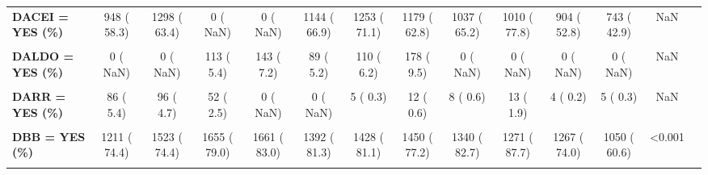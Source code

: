 \documentclass[
]{article}
\begin{document}
\begin{table}[H]
\begin{tabular}[t]{>{\raggedright\arraybackslash}p{5em}ccccccccccccc}
\textbf{DACEI = YES (\%)} & 948 ( 58.3) & 1298 ( 63.4) & 0 (  NaN) & 0 (  NaN) & 1144 ( 66.9) & 1253 ( 71.1) & 1179 ( 62.8) & 1037 ( 65.2) & 1010 ( 77.8) & 904 ( 52.8) & 743 ( 42.9) & NaN & \\
\textbf{\cellcolor{gray!10}{DACOAG = YES (\%)}} & \cellcolor{gray!10}{122 (  8.1)} & \cellcolor{gray!10}{54 (  2.6)} & \cellcolor{gray!10}{72 (  3.4)} & \cellcolor{gray!10}{94 (  4.8)} & \cellcolor{gray!10}{86 (  5.0)} & \cellcolor{gray!10}{79 (  4.5)} & \cellcolor{gray!10}{113 (  6.0)} & \cellcolor{gray!10}{130 (  7.4)} & \cellcolor{gray!10}{164 ( 17.1)} & \cellcolor{gray!10}{141 (  8.2)} & \cellcolor{gray!10}{123 (  7.1)} & \cellcolor{gray!10}{<0.001} & \cellcolor{gray!10}{}\\
\textbf{DALDO = YES (\%)} & 0 (  NaN) & 0 (  NaN) & 113 (  5.4) & 143 (  7.2) & 89 (  5.2) & 110 (  6.2) & 178 (  9.5) & 0 (  NaN) & 0 (  NaN) & 0 (  NaN) & 0 (  NaN) & NaN & \\
\textbf{\cellcolor{gray!10}{DARBL = YES (\%)}} & \cellcolor{gray!10}{0 (  NaN)} & \cellcolor{gray!10}{0 (  NaN)} & \cellcolor{gray!10}{0 (  NaN)} & \cellcolor{gray!10}{0 (  NaN)} & \cellcolor{gray!10}{139 (  8.1)} & \cellcolor{gray!10}{158 (  9.0)} & \cellcolor{gray!10}{256 ( 13.6)} & \cellcolor{gray!10}{273 ( 18.8)} & \cellcolor{gray!10}{275 ( 32.2)} & \cellcolor{gray!10}{356 ( 20.8)} & \cellcolor{gray!10}{332 ( 19.2)} & \cellcolor{gray!10}{NaN} & \cellcolor{gray!10}{}\\
\textbf{DARR = YES (\%)} & 86 (  5.4) & 96 (  4.7) & 52 (  2.5) & 0 (  NaN) & 0 (  NaN) & 5 (  0.3) & 12 (  0.6) & 8 (  0.6) & 13 (  1.9) & 4 (  0.2) & 5 (  0.3) & NaN & \\
\textbf{\cellcolor{gray!10}{DASA = YES (\%)}} & \cellcolor{gray!10}{1554 ( 93.7)} & \cellcolor{gray!10}{1839 ( 89.8)} & \cellcolor{gray!10}{1914 ( 91.4)} & \cellcolor{gray!10}{1937 ( 96.7)} & \cellcolor{gray!10}{1635 ( 95.4)} & \cellcolor{gray!10}{1684 ( 95.7)} & \cellcolor{gray!10}{1769 ( 94.1)} & \cellcolor{gray!10}{1673 ( 95.7)} & \cellcolor{gray!10}{1639 ( 98.3)} & \cellcolor{gray!10}{1550 ( 90.5)} & \cellcolor{gray!10}{1320 ( 76.1)} & \cellcolor{gray!10}{<0.001} & \cellcolor{gray!10}{}\\
\textbf{DBB = YES (\%)} & 1211 ( 74.4) & 1523 ( 74.4) & 1655 ( 79.0) & 1661 ( 83.0) & 1392 ( 81.3) & 1428 ( 81.1) & 1450 ( 77.2) & 1340 ( 82.7) & 1271 ( 87.7) & 1267 ( 74.0) & 1050 ( 60.6) & <0.001 & \\
\textbf{\cellcolor{gray!10}{DCANT = YES (\%)}} & \cellcolor{gray!10}{253 ( 16.2)} & \cellcolor{gray!10}{265 ( 12.9)} & \cellcolor{gray!10}{294 ( 14.0)} & \cellcolor{gray!10}{0 (  NaN)} & \cellcolor{gray!10}{332 ( 19.5)} & \cellcolor{gray!10}{304 ( 17.2)} & \cellcolor{gray!10}{363 ( 19.3)} & \cellcolor{gray!10}{325 ( 22.1)} & \cellcolor{gray!10}{280 ( 32.1)} & \cellcolor{gray!10}{324 ( 18.9)} & \cellcolor{gray!10}{247 ( 14.3)} & \cellcolor{gray!10}{NaN} & \cellcolor{gray!10}{}\\

\end{tabular}
\end{table}
\end{document}
